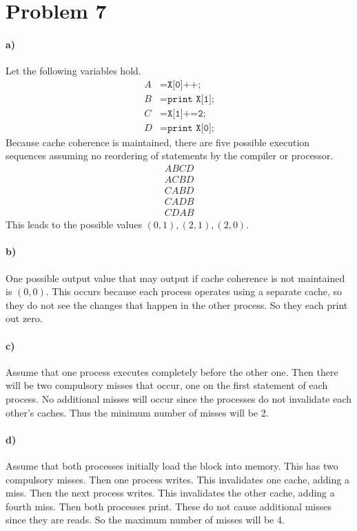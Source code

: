 \documentclass[12pt]{article}
\begin{document}
\section*{Problem 7}

\paragraph{a)}

Let the following variables hold.
\begin{align*}
        A&= \texttt{X[0]++;}\\
        B&= \texttt{print X[1];}\\
        C&= \texttt{X[1]+=2;}\\
        D&= \texttt{print X[0];}
\end{align*}
Because cache coherence is maintained, there are five possible execution sequences assuming no reordering of statements by the compiler or processor.
\begin{gather*}
        ABCD\\
        ACBD\\
        CABD\\
        CADB\\
        CDAB
\end{gather*}
This leads to the possible values \((0,1),(2,1),(2,0)\).

\paragraph{b)}

One possible output value that may output if cache coherence is not maintained is \((0,0)\). This occurs because each process operates using a separate
cache, so they do not see the changes that happen in the other process. So they each print out zero.

\paragraph{c)}

Assume that one process executes completely before the other one. Then there will be two compulsory misses that occur, one on the first statement of each
process. No additional misses will occur since the processes do not invalidate each other's caches. Thus the minimum number of misses will be 2.

\paragraph{d)}

Assume that both processes initially load the block into memory. This has two compulsory misses. Then one process writes. This invalidates one cache,
adding a miss. Then the next process writes. This invalidates the other cache, adding a fourth miss. Then both processes print. These do not cause
additional misses since they are reads. So the maximum number of misses will be 4.
\end{document}
